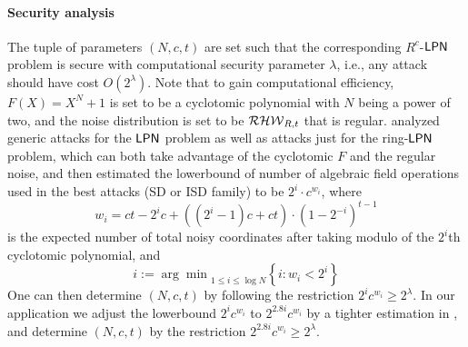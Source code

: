 \paragraph{Security analysis}The tuple of parameters $(N,c,t)$ are set such that the corresponding $R^c$-${\sf LPN}$ problem is secure with computational security parameter $\lambda$, i.e., any attack should have cost $O(2^\lambda)$. Note that to gain computational efficiency, $F(X) = X^N+1$ is set to be a cyclotomic polynomial with $N$ being a power of two, and the noise distribution is set to be $\mathcal{RHW}_{R,t}$ that is regular. \cite{cryptoeprint:2022/1035} analyzed generic attacks for the ${\sf LPN}$ problem as well as attacks just for the ring-${\sf LPN}$ problem, which can both take advantage of the cyclotomic $F$ and the regular noise, and then estimated the lowerbound of number of algebraic field operations used in the best attacks (SD or ISD family) to be $2^i\cdot c^{w_i}$, where \[
w_i=ct-2^ic+((2^i-1)c+ct)\cdot \left(1-2^{-i}\right)^{t-1}
\] is the expected number of total noisy coordinates after taking modulo of the $2^i$th cyclotomic polynomial, and
\[
i:={\arg\min}_{1\le i\le \log N}\left\{i:w_i<2^i\right\}
\]
One can then determine $(N,c,t)$ by following the restriction $2^ic^{w_i} \ge 2^\lambda$. In our application we adjust the lowerbound $2^i c^{w_i}$ to $2^{2.8i}c^{w_i}$ by a tighter estimation in \cite{cryptoeprint:2022/712}, and determine $(N,c,t)$ by the restriction $2^{2.8i}c^{w_i}\ge 2^\lambda$. 


